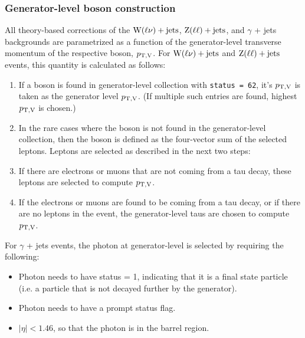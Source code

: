 \subsubsection{Generator-level boson construction}
All theory-based corrections of the $\textrm{W}(\ell\nu)+\textrm{jets}$, $\mathrm{Z}(\ell\ell)+\textrm{jets}$, and $\gamma$ + jets backgrounds are parametrized as a function of the 
generator-level transverse momentum of the respective boson, $p_{\mathrm{T},\mathrm{V}}$. For $\textrm{W}(\ell\nu)+\textrm{jets}$ and $\mathrm{Z}(\ell\ell)+\textrm{jets}$ events, this quantity is calculated as follows:

\begin{enumerate}
  \item If a boson is found in generator-level collection with \texttt{status = 62}, it's $p_{\mathrm{T},\mathrm{V}}$ is taken as the generator level $p_{\mathrm{T},\mathrm{V}}$.
  (If multiple such entries are found, highest $p_{\mathrm{T},\mathrm{V}}$ is chosen.)
  \item In the rare cases where the boson is not found in the generator-level collection, then the boson is defined as the four-vector sum of the selected leptons.
  Leptons are selected as described in the next two steps:
  \item If there are electrons or muons that are not coming from a tau decay, these leptons are selected to compute $p_{\mathrm{T},\mathrm{V}}$.
  \item If the electrons or muons are found to be coming from a tau decay, or if there are no leptons in the event, the generator-level taus 
  are chosen to compute $p_{\mathrm{T},\mathrm{V}}$.
\end{enumerate}

For $\gamma$ + jets events, the photon at generator-level is selected by requiring the following:
\begin{itemize}
    \item Photon needs to have status = 1, indicating that it is a final state particle (i.e. a particle that is not decayed further by the generator). 
    \item Photon needs to have a prompt status flag. 
    \item $|\eta|<1.46$, so that the photon is in the barrel region. 
\end{itemize}

